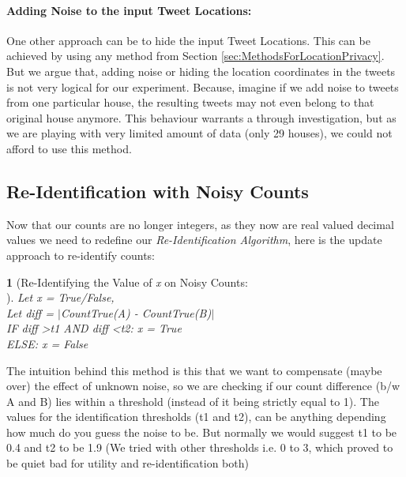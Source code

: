 \documentclass[12pt]{report}
\theoremstyle{named}
\newtheorem*{namedtheorem}{}
\begin{document}
\inputminted{python}{AddLapNoiseTime.py}


\paragraph{Adding Noise to the input Tweet Locations:\\}
One other approach can be to hide the input Tweet Locations. This can be achieved by using any method from Section \ref{sec:MethodsForLocationPrivacy}. But we argue that, adding noise or hiding the location coordinates in the tweets is not very logical for our experiment. Because, imagine if we add noise to tweets from one particular house, the resulting tweets may not even belong to that original house anymore. This behaviour warrants a through investigation, but as we are playing with very limited amount of data (only 29 houses), we could not afford to use this method.






\subsection{Re-Identification with Noisy Counts}
Now that our counts are no longer integers, as they now are real valued decimal values we need to redefine our \textit{Re-Identification Algorithm}, here is the update approach to re-identify counts:



\begin{namedtheorem}[Re-Identifying the Value of \textit{x} on Noisy Counts:\\] 

Let x = True/False,\\ 
Let diff = $\vert$CountTrue(A) - CountTrue(B)$\vert$ \\
IF diff \textgreater t1 AND diff \textless t2: x = True\\ELSE: x = False

\end{namedtheorem}

The intuition behind this method is this that we want to compensate (maybe over) the effect of unknown noise, so we are checking if our count difference (b/w A and B) lies within a threshold (instead of it being strictly equal to 1). The values for the identification thresholds (t1 and t2), can be anything depending how much do you guess the noise to be. But normally we would suggest t1 to be 0.4 and t2 to be 1.9 (We tried with other thresholds i.e. 0 to 3, which proved to be quiet bad for utility and re-identification both)
\end{document}
